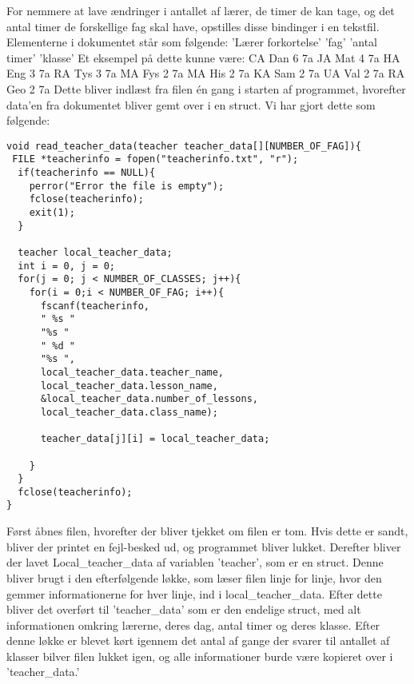 For nemmere at lave ændringer i antallet af lærer, de timer de kan tage, og det antal timer de forskellige fag skal have, opstilles disse bindinger i en tekstfil. 
Elementerne i dokumentet står som følgende:
’Lærer forkortelse’ ’fag’ ’antal timer’ ’klasse’
Et eksempel på dette kunne være:
CA Dan 6 7a
JA Mat 4 7a
HA Eng 3 7a
RA Tys 3 7a
MA Fys 2 7a
MA His 2 7a
KA Sam 2 7a
UA Val 2 7a
RA Geo 2 7a
Dette bliver indlæst fra filen én gang i starten af programmet, hvorefter data’en fra dokumentet bliver gemt over i en struct.
Vi har gjort dette som følgende:
\begin{lstlisting}
void read_teacher_data(teacher teacher_data[][NUMBER_OF_FAG]){
 FILE *teacherinfo = fopen("teacherinfo.txt", "r");
  if(teacherinfo == NULL){
    perror("Error the file is empty");
    fclose(teacherinfo);
    exit(1);
  }

  teacher local_teacher_data;
  int i = 0, j = 0;
  for(j = 0; j < NUMBER_OF_CLASSES; j++){
    for(i = 0;i < NUMBER_OF_FAG; i++){
      fscanf(teacherinfo,
      " %s "
      "%s "
      " %d "
      "%s ",
      local_teacher_data.teacher_name, 
      local_teacher_data.lesson_name, 
      &local_teacher_data.number_of_lessons, 
      local_teacher_data.class_name);

      teacher_data[j][i] = local_teacher_data; 
  
    } 
  }  
  fclose(teacherinfo);
}
\end{lstlisting}
Først åbnes filen, hvorefter der bliver tjekket om filen er tom. Hvis dette er sandt, bliver der printet en fejl-besked ud, og programmet bliver lukket.
Derefter bliver der lavet Local_teacher_data af variablen ’teacher’, som er en struct. Denne bliver brugt i den efterfølgende løkke, som læser filen linje for linje, hvor den gemmer informationerne for hver linje, ind i local_teacher_data. Efter dette bliver det overført til ’teacher_data’ som er den endelige struct, med alt informationen omkring lærerne, deres dag, antal timer og deres klasse. 
Efter denne løkke er blevet kørt igennem det antal af gange der svarer til antallet af klasser bilver filen lukket igen, og alle informationer burde være kopieret over i ’teacher_data.’
